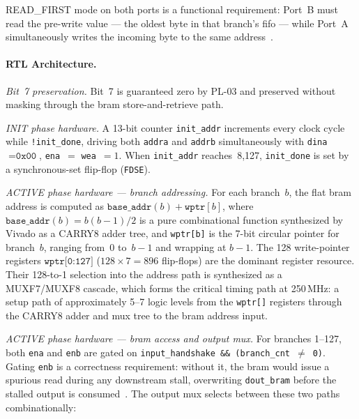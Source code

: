 READ\_FIRST mode on both ports is a functional requirement: Port~B must
read the pre-write value --- the oldest byte in that branch's \ac{fifo}
--- while Port~A simultaneously writes the incoming byte to the same
address~\cite{ITU_J83}.


\FloatBarrier
\paragraph{RTL Architecture.}

\textit{Bit~7 preservation.}
Bit~7 is guaranteed zero by PL-03 and preserved without masking through
the \ac{bram} store-and-retrieve path.

\textit{INIT phase hardware.}
A 13-bit counter \texttt{init\_addr} increments every clock cycle while
\texttt{!init\_done}, driving both \texttt{addra} and \texttt{addrb}
simultaneously with \texttt{dina}~$= \texttt{0x00}$,
\texttt{ena}~$=$ \texttt{wea}~$= 1$.
When \texttt{init\_addr} reaches~8{,}127, \texttt{init\_done} is set by
a synchronous-set flip-flop (\texttt{FDSE}).

\textit{ACTIVE phase hardware --- branch addressing.}
For each branch~$b$, the flat \ac{bram} address is computed as
$\mathtt{base\_addr}(b) + \mathtt{wptr}[b]$, where
$\mathtt{base\_addr}(b) = b(b-1)/2$ is a pure combinational function
synthesized by Vivado as a CARRY8 adder tree,
and \texttt{wptr[b]} is the 7-bit circular pointer for branch~$b$,
ranging from~0 to~$b-1$ and wrapping at $b-1$.
The 128 write-pointer registers $\texttt{wptr[0:127]}$
($128 \times 7 = 896$ flip-flops) are the dominant register resource.
Their 128-to-1 selection into the address path is synthesized as a
MUXF7/MUXF8 cascade, which forms the critical timing path at 250\,MHz:
a setup path of approximately 5--7 logic levels from the
\texttt{wptr[]} registers through the CARRY8 adder and \ac{mux} tree
to the \ac{bram} address input.

\textit{ACTIVE phase hardware --- \ac{bram} access and output mux.}
For branches 1--127, both \texttt{ena} and \texttt{enb} are gated on
\texttt{input\_handshake}~\texttt{\&\&}~\texttt{(branch\_cnt}~$\neq$~\texttt{0)}.
Gating \texttt{enb} is a correctness requirement: without it, the
\ac{bram} would issue a spurious read during any downstream stall,
overwriting \texttt{dout\_bram} before the stalled output is
consumed~\cite{ARM_IHI0022}.
The output mux selects between these two paths combinationally:

